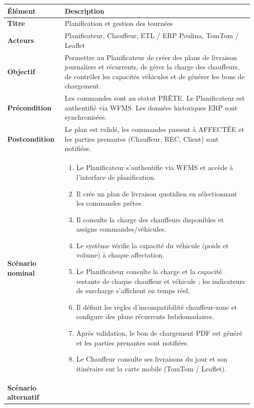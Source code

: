 \captionsetup[longtable]{justification=centering}
\setlength{\arrayrulewidth}{1pt}
\begin{longtable}{|p{4cm}|p{11cm}|}
\hline
\rowcolor{headerbg}
\textbf{Élément} & \textbf{Description} \\
\hline
\textbf{Titre} & Planification et gestion des tournées \\
\hline
\textbf{Acteurs} & Planificateur, Chauffeur, ETL / ERP Poulina, TomTom / Leaflet \\
\hline
\textbf{Objectif} & Permettre au Planificateur de créer des plans de livraison journaliers et récurrents, de gérer la charge des chauffeurs, de contrôler les capacités véhicules et de générer les bons de chargement. \\
\hline
\textbf{Précondition} & Les commandes sont au statut PRÊTE. Le Planificateur est authentifié via WFMS. Les données historiques ERP sont synchronisées. \\
\hline
\textbf{Postcondition} & Le plan est validé, les commandes passent à AFFECTÉE et les parties prenantes (Chauffeur, REC, Client) sont notifiées. \\
\hline
\textbf{Scénario nominal} &
\begin{enumerate}[start=1, label=\arabic*., nosep, leftmargin=1.4em]
    \item Le Planificateur s'authentifie via WFMS et accède à l'interface de planification.
    \item Il crée un plan de livraison quotidien en sélectionnant les commandes prêtes.
    \item Il consulte la charge des chauffeurs disponibles et assigne commandes/véhicules.
    \item Le système vérifie la capacité du véhicule (poids et volume) à chaque affectation.
    \item Le Planificateur consulte la charge et la capacité restante de chaque chauffeur et véhicule ; les indicateurs de surcharge s'affichent en temps réel.
    \item Il définit les règles d'incompatibilité chauffeur-zone et configure des plans récurrents hebdomadaires.
    \item Après validation, le bon de chargement PDF est généré et les parties prenantes sont notifiées.
    \item Le Chauffeur consulte ses livraisons du jour et son itinéraire sur la carte mobile (TomTom / Leaflet).
\end{enumerate} \\
\hline
\textbf{Scénario alternatif} &

\end{longtable}
